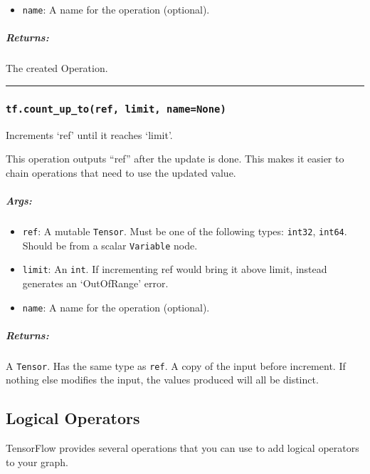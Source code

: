 \begin{itemize}
\tightlist
\item
  \texttt{name}: A name for the operation (optional).
\end{itemize}

\subparagraph{Returns: }\label{returns-3}

The created Operation.

\begin{center}\rule{0.5\linewidth}{\linethickness}\end{center}

\subsubsection{\texorpdfstring{\texttt{tf.count\_up\_to(ref,\ limit,\ name=None)}
}{tf.count\_up\_to(ref, limit, name=None) }}\label{tf.countux5fupux5ftoref-limit-namenone}

Increments `ref' until it reaches `limit'.

This operation outputs ``ref'' after the update is done. This makes it
easier to chain operations that need to use the updated value.

\subparagraph{Args: }\label{args-4}

\begin{itemize}
\tightlist
\item
  \texttt{ref}: A mutable \texttt{Tensor}. Must be one of the following
  types: \texttt{int32}, \texttt{int64}. Should be from a scalar
  \texttt{Variable} node.
\item
  \texttt{limit}: An \texttt{int}. If incrementing ref would bring it
  above limit, instead generates an `OutOfRange' error.
\item
  \texttt{name}: A name for the operation (optional).
\end{itemize}

\subparagraph{Returns: }\label{returns-4}

A \texttt{Tensor}. Has the same type as \texttt{ref}. A copy of the
input before increment. If nothing else modifies the input, the values
produced will all be distinct.

\subsection{Logical Operators }\label{logical-operators}

TensorFlow provides several operations that you can use to add logical
operators to your graph.

